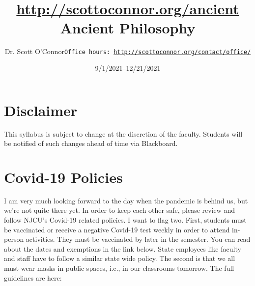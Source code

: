 \documentclass[article,oneside]{memoir}
\def\myauthor{Author}
\def\mytitle{Title}
\def\mycopyright{\myauthor}
\def\myweb{\href{http://scottoconnor.org/ancient}{http://scottoconnor.org/ancient}}
\def\myauthor{Dr. Scott O'Connor}
\def\mytitle{{\normalsize \myweb \newline} \HUGE Ancient Philosophy}
\begin{document}
\setsansfont[Mapping=tex-text]{Myriad Pro} 
\setmonofont[Mapping=tex-text,Scale=0.8]{Georgia} 

\def\ind{\hangindent=1 true cm\hangafter=1 \noindent}
\def\labelitemi{$\cdot$}


\title{\LARGE \mytitle}     
\author{\Large\myauthor \newline \footnotesize\texttt{\noindent Office hours: \href{http://scottoconnor.org/contact/office/}{http://scottoconnor.org/contact/office/}}}
\date{9/1/2021--12/21/2021}



\maketitle




%
%


\section{Disclaimer}
 This syllabus is subject to change at the discretion of the faculty. Students will be notified of such changes ahead of time via Blackboard. 

\section{Covid-19 Policies}
I am very much looking forward to the day when the pandemic is behind us, but we’re not quite there yet. In order to keep each other safe, please review and follow NJCU's Covid-19 related policies. I want to flag two. First, students must be vaccinated or receive a negative Covid-19 test weekly in order to attend in-person activities. They must be vaccinated by later in the semester. You can read about the dates and exemptions in the link below. State employees like faculty and staff have to follow a similar state wide policy. The second is that we all must wear masks in public spaces, i.e., in our classrooms tomorrow. The full guidelines are here:
\end{document}

